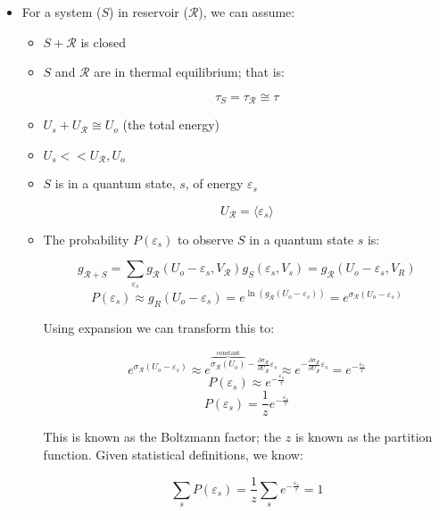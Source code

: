 \begin{itemize}

  \item For a system ($S$) in reservoir ($\mathcal{R}$), we can assume:

    \begin{itemize}

      \item $S+\mathcal{R}$ is closed

      \item $S$ and $\mathcal{R}$ are in thermal equilibrium; that is:

        $$\tau_S=\tau_{\mathcal{R}}\cong \tau$$

      \item $U_s+U_{\mathcal{R}}\cong U_o$ (the total energy)

      \item $U_s << U_{\mathcal{R}}, U_o$

      \item $S$ is in a quantum state, $s$, of energy $\varepsilon_s$

        $$U_{\mathcal{R}}=\langle \varepsilon_s\rangle$$

      \item The probability $P(\varepsilon_s)$ to observe $S$ in a quantum state $s$ is:

        $$g_{\mathcal{R}+S}=\sum_{\varepsilon_s}g_{\mathcal{R}}(U_o-\varepsilon_s,V_{\mathcal{R}})g_S(\varepsilon_s,V_s)=g_{\mathcal{R}}(U_o-\varepsilon_s,V_R)$$
        $$P(\varepsilon_s)\approx g_R(U_o-\varepsilon_s)=e^{\ln(g_{\mathcal{R}}(U_o-\varepsilon_s))}=e^{\sigma_{\mathcal{R}}(U_o-\varepsilon_s)}$$

        Using expansion we can transform this to:

        $$e^{\sigma_{\mathcal{R}}(U_o-\varepsilon_s)}\approx e^{\overbrace{\sigma_{\mathcal{R}}(U_o)}^{\text{constant}}-\frac{\partial \sigma_{\mathcal{R}}}{\partial U_{\mathcal{R}}}\varepsilon_s}\approx e^{-\frac{\partial \sigma_{\mathcal{R}}}{\partial U_{\mathcal{R}}}\varepsilon_s}=e^{-\frac{\varepsilon_s}{\tau}}$$
        $$\boxed{P(\varepsilon_s)\approx e^{-\frac{\varepsilon_s}{\tau}}}$$
        $$\boxed{P(\varepsilon_s)= \frac{1}{z}e^{-\frac{\varepsilon_s}{\tau}}}$$

        This is known as the Boltzmann factor; the $z$ is known as the partition function. Given statistical definitions, we know:

        $$\sum_s P(\varepsilon_s)=\frac{1}{z}\sum_s e^{-\frac{\varepsilon_s}{\tau}}=1$$


\end{itemize}
\end{itemize}
